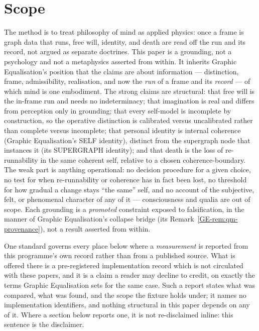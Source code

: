 \documentclass[11pt,a4paper]{article}
\theoremstyle{remark}\newtheorem{remark}[definition]{Remark}
\begin{document}
\section{Scope}\label{sec:scope}
The method is to treat philosophy of mind as applied physics: once a frame is graph
data that runs, free will, identity, and death are read off the run and its record,
not argued as separate doctrines. This paper is a grounding, not a psychology and not
a metaphysics asserted from within. It inherits Graphic Equalisation's position that the claims are about
information --- distinction, frame, admissibility, realisation, and now the
\emph{run} of a frame and its \emph{record} --- of which mind is one embodiment.
The strong claims are structural: that free will is the in-frame run and needs no
indeterminacy; that imagination is real and differs from perception only in
grounding; that every self-model is incomplete by construction, so the operative
distinction is calibrated versus uncalibrated rather than complete versus incomplete;
that personal identity is internal coherence (Graphic Equalisation's SELF
identity), distinct from the supergraph node that instances it (its SUPERGRAPH
identity); and that death is the loss of re-runnability in
the same coherent self, relative to a chosen coherence-boundary. The weak part is
anything operational: no decision procedure for a given choice, no test for when
re-runnability or coherence has in fact been lost, no threshold for how gradual a
change stays ``the same'' self, and no account of the subjective, felt, or
phenomenal character of any of it --- consciousness and qualia are out of scope.
Each grounding is a \emph{promoted} constraint exposed to falsification, in the
manner of Graphic Equalisation's collapse bridge (its
Remark~\ref{GE-rem:qm-provenance}), not a result asserted from within.

One standard governs every place below where a \emph{measurement} is reported from this
programme's own record rather than from a published source. What is offered there is a
pre-registered implementation record which is not circulated with these papers, and it is a
claim a reader may decline to credit, on exactly the terms Graphic Equalisation sets for the
same case. Such a report states what was compared, what was found, and the scope the fixture
holds under; it names no implementation identifiers, and nothing structural in this paper
depends on any of it. Where a section below reports one, it is not re-disclaimed inline: this
sentence is the disclaimer.
\end{document}
